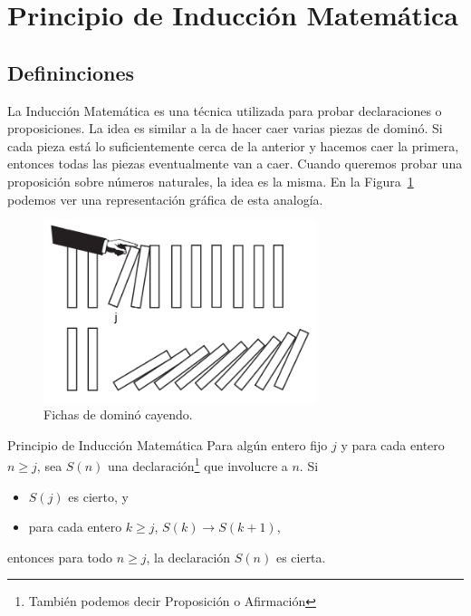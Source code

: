 \newpage
\section{Principio de Inducción Matemática}\label{mathematical-induction}

\subsection{Defininciones}

La Inducción Matemática es una técnica utilizada para probar declaraciones o proposiciones.
La idea es similar a la de hacer caer varias piezas de dominó.
Si cada pieza está lo suficientemente cerca de la anterior y hacemos caer la primera, entonces todas las piezas eventualmente van a caer.
Cuando queremos probar una proposición sobre números naturales, la idea es la misma.
En la Figura~\ref{fig:figure} podemos ver una representación gráfica de esta analogía.

\begin{figure}[htb]
    \centering
    \includegraphics[width=8cm]{images/dominoes-fall}
    \caption{Fichas de dominó cayendo.}
    \label{fig:figure}
\end{figure}

\begin{section-theorem.tcb}{Principio de Inducción Matemática}{}
    Para algún entero fijo $j$ y para cada entero $n \geq j$, sea $S(n)$ una declaración\footnote{También podemos decir Proposición o Afirmación} que involucre a $n$. Si
    \begin{itemize}
        \item $S(j)$ es cierto, y
        \item para cada entero $k \geq j$, $S(k) \rightarrow S(k + 1)$,
    \end{itemize}
    entonces para todo $n \geq j$, la declaración $S(n)$ es cierta.
\end{section-theorem.tcb}

